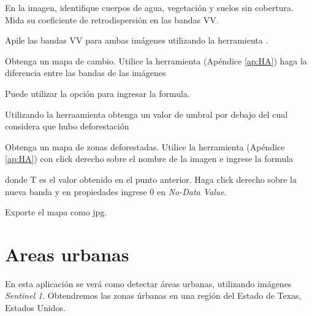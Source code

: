 \begin{que}
    En la imagen, identifique cuerpos de agua, vegetación y suelos sin cobertura. Mida su coeficiente de retrodispersión en las bandas VV.
\end{que}

\begin{que}
  Apile las bandas VV para ambas imágenes utilizando la herramienta .
\end{que}

\begin{que}
    Obtenga un mapa de cambio. Utilice la herramienta  (Apéndice \ref{ap:HA}) haga la diferencia entre las bandas de las imágenes
    \begin{center}
    \end{center}
    Puede utilizar la opción  para ingresar la formula.
\end{que}

\begin{que}
    Utilizando la herraamienta  obtenga un valor de umbral por debajo del cual considera que hubo deforestación
\end{que}

\begin{que}
    Obtenga un mapa de zonas deforestadas. Utilice la herramienta  (Apéndice \ref{ap:HA}) con click derecho sobre el nombre de la imagen e ingrese la formula
    \begin{center}
    \end{center}
    donde T es el valor obtenido en el punto anterior. Haga click derecho sobre la nueva banda y en propiedades ingrese 0 en \emph{No-Data Value}.
\end{que}

\begin{que}
    Exporte el mapa como jpg.
\end{que}


\section{Areas urbanas}

En esta aplicación se verá como detectar áreas urbanas, utilizando imágenes \emph{Sentinel 1}. Obtendremos las zonas úrbanas en una región del Estado de Texas, Estados Unidos.


